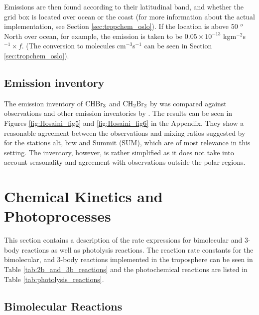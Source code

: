 Emissions are then found according to their latitudinal band, and whether the grid box is located over ocean or the coast (for more information about the actual implementation, see Section \ref{sec:tropchem_oslo}). If the location is above 50 $^o$ North over ocean, for example, the emission is taken to be $0.05\times10^{-13}$ kgm$^{-2}$s$^{-1}\times f$. (The conversion to molecules cm$^{-3}$s$^{-1}$ can be seen in Section \ref{sec:tropchem_oslo}). 


\subsection{Emission inventory}

The emission inventory of $\mathrm{CHBr_3}$ and $\mathrm{CH_2Br_2}$ by \cite{Liang2010} was compared against observations and other emission inventories by \cite{Hossaini2013}. The results can be seen in Figures \ref{fig:Hosaini_fig5} and \ref{fig:Hosaini_fig6} in the Appendix. They show a reasonable agreement between the observations and mixing ratios suggested by \cite{Liang2010} for the stations \acrfull{alt}, \acrfull{brw} and Summit (SUM), which are of most relevance in this setting. The inventory, however, is rather simplified as it does not take into account seasonality and agreement with observations outside the polar regions. 





\section{Chemical Kinetics and Photoprocesses}\label{sec:chem_kinetics}

This section contains a description of the rate expressions for bimolecular and 3-body reactions as well as photolysis reactions. The reaction rate constants for the bimolecular, and 3-body reactions implemented in the troposphere can be seen in Table \ref{tab:2b_and_3b_reactions} and the photochemical reactions are listed in Table \ref{tab:photolysis_reactions}.






\subsection{Bimolecular Reactions}\label{sec:bimolecular_reactions}


